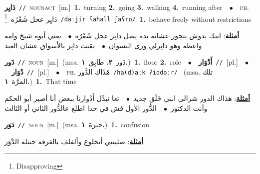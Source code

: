\documentclass[10pt,a4paper,twoside]{article} %
\begin{document}
\begin{multicols}{2}
{\setlength\topsep{0pt}\textbf{\foreignlanguage{arabic}{دَايِر}}\ {\color{gray}\texttt{//}\color{black}}\ \textsc{noun\textunderscore act}\ [m.]\ \textbf{1.}~turning  \textbf{2.}~going  \textbf{3.}~walking  \textbf{4.}~running after\ \ $\bullet$\ \ \textsc{ph.} \color{gray} \foreignlanguage{arabic}{دَايِر عحل شَعْرُه}\color{black}\ \footnote{Disapproving}\ {\color{gray}\texttt{/{\sffamily daːjir ʕaħall ʃaʕro}/}\color{black}}\ \textbf{1.}~behave freely without restrictions\  \begin{flushright}\color{gray}\foreignlanguage{arabic}{\textbf{\underline{\foreignlanguage{arabic}{أمثلة}}}: ابنك بدوش يتجوز عشانه بده يضل دايِر عحل شَعْرُه\ $\bullet$\ \  يعني أبوه شيخ وامه واعظة وهو دايِرلي ورى النسوان\ $\bullet$\ \  بقيت دايِر بالأسواق عشان العيد}\end{flushright}\color{black}} \vspace{2mm}

{\setlength\topsep{0pt}\textbf{\foreignlanguage{arabic}{دَور}}\ {\color{gray}\texttt{//}\color{black}}\ \textsc{noun}\ [m.]\ \color{gray}(msa. \foreignlanguage{arabic}{دَور}~\foreignlanguage{arabic}{\textbf{٢.}}  \foreignlanguage{arabic}{طابِق}~\foreignlanguage{arabic}{\textbf{١.}})\color{black}\ \textbf{1.}~floor  \textbf{2.}~role\ \ $\bullet$\ \ \setlength\topsep{0pt}\textbf{\foreignlanguage{arabic}{أَدْوَار}}\ {\color{gray}\texttt{//}\color{black}}\ [pl.]\ \ $\bullet$\ \ \setlength\topsep{0pt}\textbf{\foreignlanguage{arabic}{دْوَار}}\ {\color{gray}\texttt{//}\color{black}}\ [pl.]\ \ $\bullet$\ \ \textsc{ph.} \color{gray} \foreignlanguage{arabic}{هَذَاك الدَّور}\color{black}\ {\color{gray}\texttt{/{\sffamily ha(d)aːk ʔiddoːr}/}\color{black}}\ \color{gray} (msa. \foreignlanguage{arabic}{تلك المرَّة}~\foreignlanguage{arabic}{\textbf{١.}})\color{black}\ \textbf{1.}~That time\  \begin{flushright}\color{gray}\foreignlanguage{arabic}{\textbf{\underline{\foreignlanguage{arabic}{أمثلة}}}: هذاك الدور شرالي ابني خَلَق جديد\ $\bullet$\ \  تعا نبدِّل أَدْوارنا ببعض أنا أصير أبو الحكم وأنت الدكتور\ $\bullet$\ \  الدُّور الأول فش في حدا اطلع عالدُّور الثاني أو الثالث}\end{flushright}\color{black}} \vspace{2mm}

{\setlength\topsep{0pt}\textbf{\foreignlanguage{arabic}{دَوَر}}\ {\color{gray}\texttt{//}\color{black}}\ \textsc{noun}\ [m.]\ \color{gray}(msa. \foreignlanguage{arabic}{حيرة}~\foreignlanguage{arabic}{\textbf{١.}})\color{black}\ \textbf{1.}~confusion\  \begin{flushright}\color{gray}\foreignlanguage{arabic}{\textbf{\underline{\foreignlanguage{arabic}{أمثلة}}}: ضليتني أتخلوع وألفلف بالغرفة جبتله الدَّوَر}\end{flushright}\color{black}} \vspace{2mm}


\end{multicols}
\end{document}
